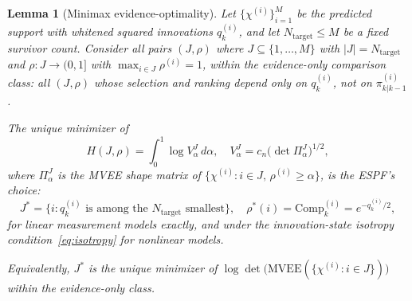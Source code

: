 \documentclass[12pt]{article}
\newtheorem{lemma}[theorem]{Lemma}
\begin{document}
\begin{lemma}[Minimax evidence-optimality]
\label{lem:minimax}
Let $\{\chi^{(i)}\}^M_{i=1}$ be the predicted support with whitened squared innovations $q^{(i)}_k$, and let $N_{\mathrm{target}} \leq M$ be a fixed survivor count. Consider all pairs $(J,\rho)$ where $J \subseteq \{1,\ldots,M\}$ with $|J| = N_{\mathrm{target}}$ and $\rho : J \to (0,1]$ with $\max_{i\in J}\rho^{(i)} = 1$, within the evidence-only comparison class: all $(J,\rho)$ whose selection and ranking depend only on $q^{(i)}_k$, not on $\pi^{(i)}_{k|k-1}$.

The unique minimizer of
\begin{equation}
H(J,\rho) = \int_0^1 \log V^J_\alpha\,d\alpha,\quad V^J_\alpha = c_n\bigl(\det\Pi^J_\alpha\bigr)^{1/2},
\end{equation}
where $\Pi^J_\alpha$ is the MVEE shape matrix of $\{\chi^{(i)} : i \in J,\, \rho^{(i)} \geq \alpha\}$, is the ESPF's choice:
\begin{equation}
J^* = \bigl\{i : q^{(i)}_k \text{ is among the } N_{\mathrm{target}} \text{ smallest}\bigr\},\quad \rho^*(i) = \mathrm{Comp}^{(i)}_k = e^{-q^{(i)}_k/2},
\end{equation}
for linear measurement models exactly, and under the innovation-state isotropy condition~\eqref{eq:isotropy} for nonlinear models.

Equivalently, $J^*$ is the unique minimizer of $\log\det\bigl(\mathrm{MVEE}(\{\chi^{(i)} : i \in J\})\bigr)$ within the evidence-only class.
\end{lemma}
\end{document}
